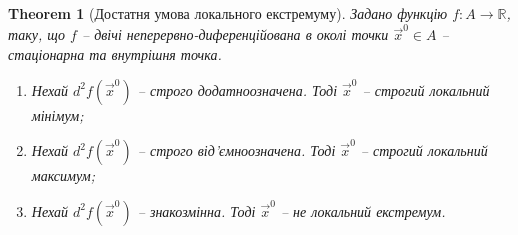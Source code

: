 \documentclass[a4paper, 10pt]{article}
\theoremstyle{theoremdd}
\newtheorem{theorem}{Theorem}[subsection]
\theoremstyle{theoremdd}
\theoremstyle{theoremdd}
\theoremstyle{theoremdd}
\theoremstyle{theoremdd}
\theoremstyle{theoremdd}
\theoremstyle{theoremdd}
\theoremstyle{theoremdd}
\theoremstyle{theoremdd}
\begin{document}
\begin{theorem}[Достатня умова локального екстремуму]
Задано функцію $f\colon A \to \mathbb{R}$, таку, що $f$ -- двічі неперервно-диференційована в околі точки $\vec{x}^0 \in A$ -- стаціонарна та внутрішня точка.
\begin{enumerate}[nosep,wide=0pt,label={\arabic*)}]
\item Нехай $d^2 f(\vec{x}^0)$ -- строго додатноозначена. Тоді $\vec{x}^0$ -- строгий локальний мінімум;
\item Нехай $d^2 f(\vec{x}^0)$ -- строго від'ємноозначена. Тоді $\vec{x}^0$ -- строгий локальний максимум;
\item Нехай $d^2 f(\vec{x}^0)$ -- знакозмінна. Тоді $\vec{x}^0$ -- не локальний екстремум.
\end{enumerate}
\end{theorem}
\end{document}
